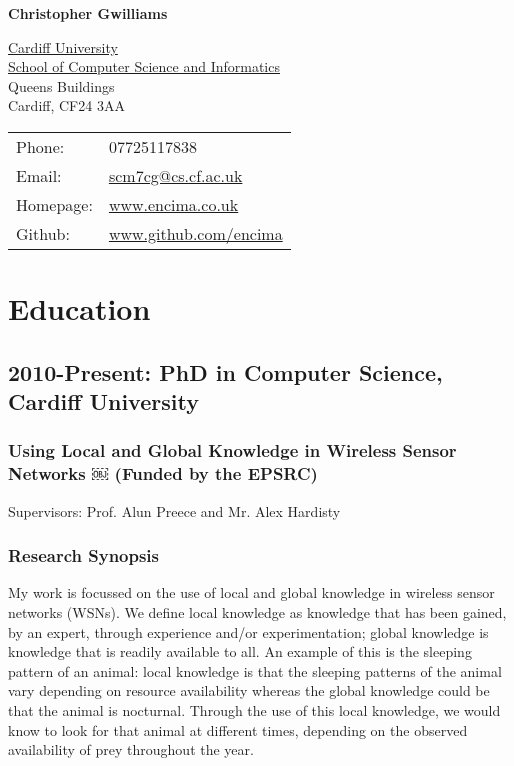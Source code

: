 \documentclass[11pt,fullpage]{article}
\def\name{Christopher Gwilliams}
\begin{document}


\centerline{\Large \bf \name}

\vspace{0.25in}

\begin{minipage}{0.50\linewidth}
  \href{http://cf.ac.uk/}{Cardiff University} \\
  \href{http://cs.cf.ac.uk}{School of Computer Science and Informatics} \\
  Queens Buildings \\
Cardiff, CF24 3AA
\end{minipage}
\begin{minipage}{0.50\linewidth}
  \begin{tabular}{ll}
    Phone: & 07725117838 \\
    Email: & \href{mailto:scm7cg@cs.cf.ac.uk}{scm7cg@cs.cf.ac.uk} \\
    Homepage: & \href{http://www.encima.co.uk/}{www.encima.co.uk} \\
    Github: & \href{http:/github.com/encima/}{www.github.com/encima} \\
  \end{tabular}
\end{minipage}

\section*{Education}
\subsection*{\textbf{2010-Present: PhD} in Computer Science, Cardiff University}
\subsubsection*{Using Local and Global Knowledge in Wireless Sensor Networks
￼ (Funded by the EPSRC)}
Supervisors: Prof. Alun Preece and Mr. Alex Hardisty
\subsubsection*{Research Synopsis}
My work is focussed on the use of local and global knowledge in wireless sensor networks (WSNs). We define local knowledge as knowledge that has been gained, by an expert, through experience and/or experimentation; global knowledge is knowledge that is readily available to all. An example of this is the sleeping pattern of an animal: local knowledge is that the sleeping patterns of the animal vary depending on resource availability whereas the global knowledge could be that the animal is nocturnal. Through the use of this local knowledge, we would know to look for that animal at different times, depending on the observed availability of prey throughout the year.
\end{document}
